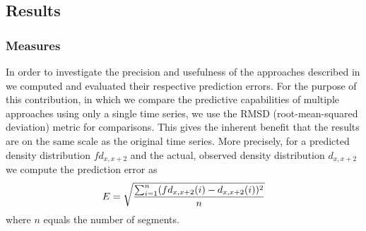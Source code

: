 \documentclass[12pt,a4paper,twoside,openright]{book}
\begin{document}
\subsection{Results}
\label{subsec:results}
\subsubsection{Measures}
\label{subsubsec:measures}
In order to investigate the precision and usefulness of the approaches described in  we computed and evaluated their respective prediction errors.
%
For the purpose of this contribution, in which we compare the predictive capabilities of multiple approaches using only a single time series, we use the RMSD (root-mean-squared deviation) metric for comparisons.
%
This gives the inherent benefit that the results are on the same scale as the original time series.
%
More precisely, for a predicted density distribution $fd_{x,x+2}$ and the actual, observed density distribution $d_{x,x+2}$ we compute the prediction error as $$E = \sqrt{ \sum_{i=1}^{n} (fd_{x,x+2}(i) - d_{x,x+2}(i))^2 \over n }$$ where $n$ equals the number of segments. 
\end{document}
